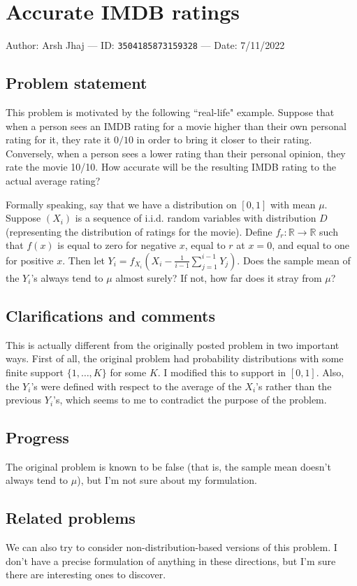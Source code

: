 
\section{Accurate IMDB ratings}

Author: Arsh Jhaj --- ID: \verb`3504185873159328` --- Date: 7/11/2022

\subsection{Problem statement}

This problem is motivated by the following ``real-life" example. Suppose that when a person sees an IMDB rating for a movie higher than their own personal rating for it, they rate it $0/10$ in order to bring it closer to their rating. Conversely, when a person sees a lower rating than their personal opinion, they rate the movie 10/10. How accurate will be the resulting IMDB rating to the actual average rating?

Formally speaking, say that we have a distribution on $[0,1]$ with mean $\mu$. Suppose $(X_i)$ is a sequence of i.i.d. random variables with distribution $D$ (representing the distribution of ratings for the movie). Define $f_r:\mathbb{R}\to\mathbb{R}$ such that $f(x)$ is equal to zero for negative $x$, equal to $r$ at $x=0$, and equal to one for positive $x$. Then let $Y_i=f_{X_i}(X_i-\frac{1}{i-1}\sum_{j=1}^{i-1}Y_j)$. Does the sample mean of the $Y_i$'s always tend to $\mu$ almost surely? If not, how far does it stray from $\mu$?

\subsection{Clarifications and comments}

This is actually different from the originally posted problem in two important ways. First of all, the original problem had probability distributions with some finite support $\{1,\ldots,K\}$ for some $K$. I modified this to support in $[0,1]$. Also, the $Y_i$'s were defined with respect to the average of the $X_i$'s rather than the previous $Y_i$'s, which seems to me to contradict the purpose of the problem.

\subsection{Progress}

The original problem is known to be false (that is, the sample mean doesn't always tend to $\mu$), but I'm not sure about my formulation.

\subsection{Related problems}

We can also try to consider non-distribution-based versions of this problem. I don't have a precise formulation of anything in these directions, but I'm sure there are interesting ones to discover.

